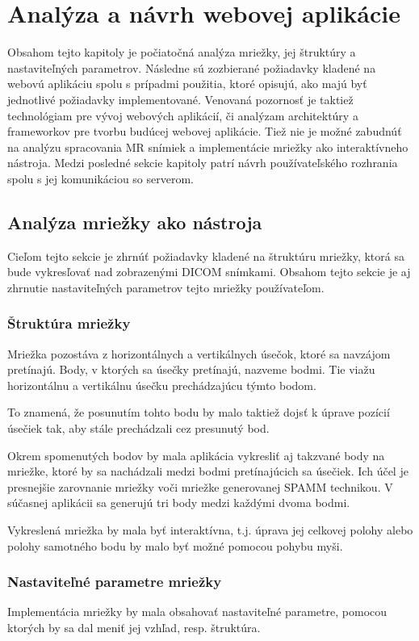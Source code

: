 \chapter {Analýza a návrh webovej aplikácie}
Obsahom tejto kapitoly je počiatočná analýza mriežky, jej štruktúry a nastaviteľných parametrov. Následne sú zozbierané požiadavky kladené na webovú aplikáciu spolu s prípadmi použitia, ktoré opisujú, ako majú byť jednotlivé požiadavky implementované. Venovaná pozornosť je taktiež technológiam pre vývoj webových aplikácií, či analýzam architektúry a frameworkov pre tvorbu budúcej webovej aplikácie. Tiež nie je možné zabudnúť na analýzu spracovania MR snímiek a implementácie mriežky ako interaktívneho nástroja. Medzi posledné sekcie kapitoly patrí návrh používateľského rozhrania spolu s jej komunikáciou so serverom.

\section {Analýza mriežky ako nástroja}
Cieľom tejto sekcie je zhrnúť požiadavky kladené na štruktúru mriežky, ktorá sa bude vykresľovať nad zobrazenými DICOM snímkami. Obsahom tejto sekcie je aj zhrnutie nastaviteľných parametrov tejto mriežky používateľom.

\subsection {Štruktúra mriežky}
Mriežka pozostáva z horizontálnych a vertikálnych úsečok, ktoré sa navzájom pretínajú. Body, v ktorých sa  úsečky pretínajú, nazveme  bodmi. Tie viažu horizontálnu a vertikálnu úsečku prechádzajúcu týmto bodom.

\clearpage

To znamená, že posunutím tohto bodu by malo taktiež dojsť k úprave pozícií úsečiek tak, aby stále prechádzali cez presunutý bod.

Okrem spomenutých bodov by mala aplikácia vykresliť aj takzvané  body na mriežke, ktoré by sa nachádzali medzi bodmi pretínajúcich sa úsečiek. Ich účel je presnejšie zarovnanie mriežky voči mriežke generovanej SPAMM technikou. V súčasnej aplikácii sa generujú tri  body medzi každými dvoma  bodmi.

Vykreslená mriežka by mala byť interaktívna, t.j. úprava jej celkovej polohy alebo polohy samotného bodu by malo byť možné pomocou pohybu myši.

\subsection {Nastaviteľné parametre mriežky}\label{grid_settings}
Implementácia mriežky by mala obsahovať nastaviteľné parametre, pomocou ktorých by sa dal meniť jej vzhľad, resp. štruktúra.

